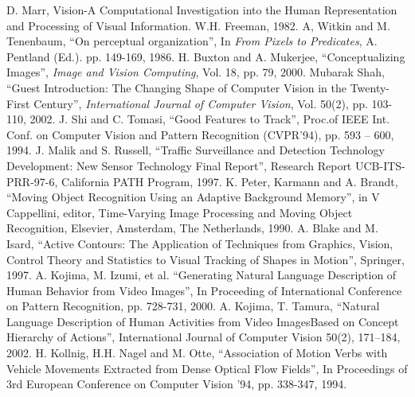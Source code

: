 \begin{thebibliography}{200}
 D. Marr, Vision-A Computational Investigation into the Human Representation and Processing of Visual Information. W.H. Freeman, 1982.
 A, Witkin and M. Tenenbaum, ``On perceptual organization'', In \textit{From Pixels to Predicates}, A. Pentland (Ed.). pp. 149-169, 1986.
 H. Buxton and A. Mukerjee, ``Conceptualizing Images'', \textit{Image and Vision Computing}, Vol. 18, pp. 79, 2000.
 Mubarak Shah, ``Guest Introduction: The Changing Shape of Computer Vision in the Twenty-First Century'', \textit{International Journal of Computer Vision}, Vol. 50(2), pp. 103-110, 2002.
 J. Shi and C. Tomasi, “Good Features to Track”, Proc.of IEEE Int. Conf. on Computer Vision and Pattern Recognition (CVPR'94), pp. 593 -- 600, 1994.
 J. Malik and S. Russell, “Traffic Surveillance and Detection Technology Development: New Sensor Technology Final Report”, Research Report UCB-ITS-PRR-97-6, California PATH Program, 1997.
 K. Peter, Karmann and A. Brandt, ``Moving Object Recognition Using an Adaptive Background Memory”, in V Cappellini, editor, Time-Varying Image Processing and Moving Object Recognition, Elsevier, Amsterdam, The Netherlands, 1990.
 A. Blake and M. Isard, “Active Contours: The Application of Techniques from Graphics, Vision, Control Theory and Statistics to Visual Tracking of Shapes in Motion'', Springer, 1997.
 A. Kojima, M. Izumi, et al. ``Generating Natural Language Description of Human Behavior from Video Images'', In Proceeding of International Conference on Pattern Recognition, pp. 728-731, 2000.
 A. Kojima, T. Tamura, ``Natural Language Description of Human Activities from Video ImagesBased on Concept Hierarchy of Actions'', International Journal of Computer Vision 50(2), 171--184, 2002.
 H. Kollnig, H.H. Nagel and M. Otte, ``Association of Motion Verbs with Vehicle Movements Extracted from Dense Optical Flow Fields'', In Proceedings of 3rd European Conference on Computer Vision '94, pp. 338-347, 1994.

\end{thebibliography}
